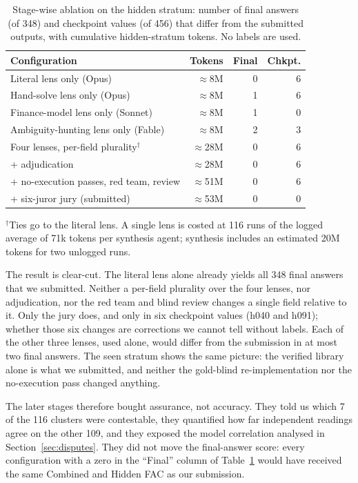 \documentclass[conference]{IEEEtran}
\begin{document}
\begin{table}[t]
\centering
\caption{Stage-wise ablation on the hidden stratum: number of final answers (of 348) and checkpoint values (of 456)
that differ from the submitted outputs, with cumulative hidden-stratum tokens. No labels are used.}
\label{tab:ablation}
\begin{tabular}{@{}lrrr@{}}
\toprule
Configuration & Tokens & Final & Chkpt. \\
\midrule
Literal lens only (Opus) & $\approx$8M & 0 & 6 \\
Hand-solve lens only (Opus) & $\approx$8M & 1 & 6 \\
Finance-model lens only (Sonnet) & $\approx$8M & 1 & 0 \\
Ambiguity-hunting lens only (Fable) & $\approx$8M & 2 & 3 \\
\midrule
Four lenses, per-field plurality$^\dagger$ & $\approx$28M & 0 & 6 \\
\quad + adjudication & $\approx$28M & 0 & 6 \\
\quad + no-execution passes, red team, review & $\approx$51M & 0 & 6 \\
\quad + six-juror jury (submitted) & $\approx$53M & 0 & 0 \\
\bottomrule
\end{tabular}

\smallskip
\raggedright\footnotesize $^\dagger$Ties go to the literal lens. A single lens is costed at 116 runs of the logged
average of 71k tokens per synthesis agent; synthesis includes an estimated 20M tokens for two unlogged runs.
\end{table}

The result is clear-cut. The literal lens alone already yields all 348 final answers that we submitted. Neither a
per-field plurality over the four lenses, nor adjudication, nor the red team and blind review changes a single field
relative to it. Only the jury does, and only in six checkpoint values (h040 and h091); whether those six changes are
corrections we cannot tell without labels. Each of the other three lenses, used alone, would differ from the
submission in at most two final answers. The seen stratum shows the same picture: the verified library alone is what we
submitted, and neither the gold-blind re-implementation nor the no-execution pass changed anything.

The later stages therefore bought assurance, not accuracy. They told us which 7 of the 116 clusters were contestable,
they quantified how far independent readings agree on the other 109, and they exposed the model correlation analysed in
Section~\ref{sec:disputes}. They did not move the final-answer score: every configuration with a zero in the ``Final''
column of Table~\ref{tab:ablation} would have received the same Combined and Hidden FAC as our submission.
\end{document}
